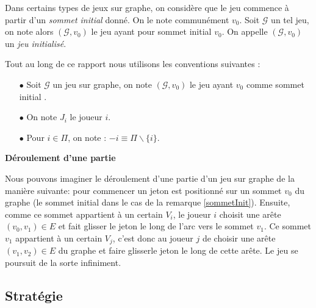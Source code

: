 \begin{defi}\label{sommetInit}
	Dans certains types de jeux sur graphe, on considère que le jeu commence à partir d'un \textit{sommet initial} donné. On le note communément $v_{0}$. Soit $\mathcal{G}$ un tel jeu, on note alors $(\mathcal{G},v_{0})$ le jeu ayant pour sommet initial $v_{0}$. On appelle $(\mathcal{G},v_{0})$ un \textit{jeu initialisé}.
\end{defi}

\begin{notations}
	Tout au long de ce rapport nous utilisons les conventions suivantes :
	\begin{enumerate}
		\item[$\bullet$] Soit $\mathcal{G}$ un jeu sur graphe, on note $(\mathcal{G},v_{0})$ le jeu ayant $v_{0}$ comme sommet initial .
		
		\item[$\bullet$] On note $J_{i}$  le joueur $i$.
		
		\item[$\bullet$] Pour $i\in \Pi$, on note : $-i\equiv \Pi\backslash \{ i\} $.
	\end{enumerate}
\end{notations}



\noindent\textbf{Déroulement d'une partie}\label{derPar}

Nous pouvons imaginer le déroulement d'une partie d'un jeu sur graphe de la manière suivante: pour commencer un jeton est positionné sur un sommet $v_{0}$ du graphe (le sommet initial dans le cas de la remarque \ref{sommetInit}). Ensuite, comme ce sommet appartient à un certain $V_{i}$, le joueur $i$ choisit une arête $(v_{0},v_{1}) \in E$ et fait \og glisser \fg le jeton le long de l'arc vers le sommet $v_{1}$. Ce sommet $v_{1}$ appartient à un certain $V_{j}$, c'est donc au joueur $j$ de choisir une arête $(v_{1},v_{2})\in E$ du graphe et faire \og glisser\fg le jeton le long de cette arête. Le jeu se poursuit de la sorte infiniment. \\


\subsection{Stratégie}




